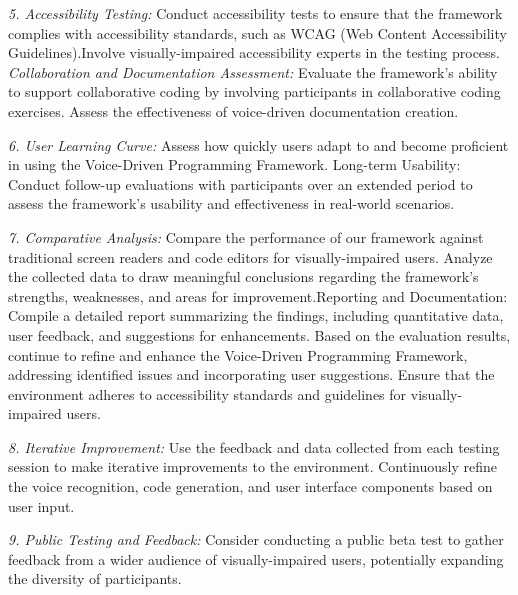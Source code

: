 {\em 5. Accessibility Testing:} Conduct accessibility tests to ensure
that the framework complies with accessibility standards, such as WCAG
(Web Content Accessibility Guidelines).Involve visually-impaired
accessibility experts in the testing process. {\em Collaboration and
  Documentation Assessment:} Evaluate the framework's ability to
support collaborative coding by involving participants in
collaborative coding exercises.  Assess the effectiveness of
voice-driven documentation creation.

{\em 6. User Learning Curve:} Assess how quickly users adapt to and
become proficient in using the Voice-Driven Programming
Framework. Long-term Usability: Conduct follow-up evaluations with
participants over an extended period to assess the framework's
usability and effectiveness in real-world scenarios.

{\em 7. Comparative Analysis:} Compare the performance of our
framework against traditional screen readers and code editors for
visually-impaired users. Analyze the collected data to draw meaningful
conclusions regarding the framework's strengths, weaknesses, and areas
for improvement.Reporting and Documentation: Compile a detailed report
summarizing the findings, including quantitative data, user feedback,
and suggestions for enhancements. Based on the evaluation results,
continue to refine and enhance the Voice-Driven Programming Framework,
addressing identified issues and incorporating user suggestions.
Ensure that the environment adheres to accessibility standards and
guidelines for visually-impaired users.

{\em 8. Iterative Improvement:} Use the feedback and data collected
from each testing session to make iterative improvements to the
environment.  Continuously refine the voice recognition, code
generation, and user interface components based on user input.

{\em 9. Public Testing and Feedback:} Consider conducting a public
beta test to gather feedback from a wider audience of
visually-impaired users, potentially expanding the diversity of
participants.




